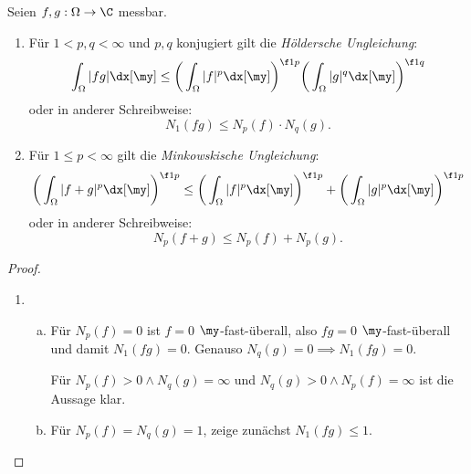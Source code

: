 \begin{st} \label{2.7}
	Seien $f,g : \Omega \to \C$ messbar.
	\begin{enumerate}[1)]
		\item
			Für $1 < p,q < \infty$ und $p,q$ konjugiert gilt die \emph{Höldersche Ungleichung}:
			\[
				\int_{\Omega} |fg| \dx[\my] \le \bigg(\int_{\Omega}|f|^p \dx[\my] \bigg)^{\f 1p} \bigg( \int_{\Omega} |g|^q \dx[\my] \bigg)^{\f 1q}
			\]
			oder in anderer Schreibweise:
			\[
				N_1(fg) \le N_p(f) \cdot N_q(g).
			\]
		\item
			Für $1 \le p < \infty$ gilt die \emph{Minkowskische Ungleichung}:
			\[
				\bigg( \int_{\Omega} |f+g|^p \dx[\my] \bigg)^{\f 1p} \le  \bigg(\int_{\Omega} |f|^p \dx[\my]\bigg)^{\f 1p} + \bigg( \int_{\Omega} |g|^p \dx[\my] \bigg)^{\f 1p}
			\]
			oder in anderer Schreibweise:
			\[
				N_p(f+g) \le N_p(f) + N_p(g).
			\]
	\end{enumerate}
	\begin{proof}
		\begin{enumerate}[1)]
			\item
				\begin{enumerate}[a)]
					\item
						Für $N_p(f) = 0$ ist $f =0 $ $\my$-fast-überall, also $fg = 0$ $\my$-fast-überall und damit $N_1(fg) = 0$.
						Genauso $N_q(g) = 0 \implies N_1(fg) = 0$.

						Für $N_p(f) > 0 \land N_q(g) = \infty$ und $N_q(g) > 0 \land N_p(f) = \infty$ ist die Aussage klar.
					\item
						Für $N_p(f) = N_q(g) = 1$, zeige zunächst $N_1(fg) \le 1$.


\end{enumerate}
\end{enumerate}
\end{proof}
\end{st}
